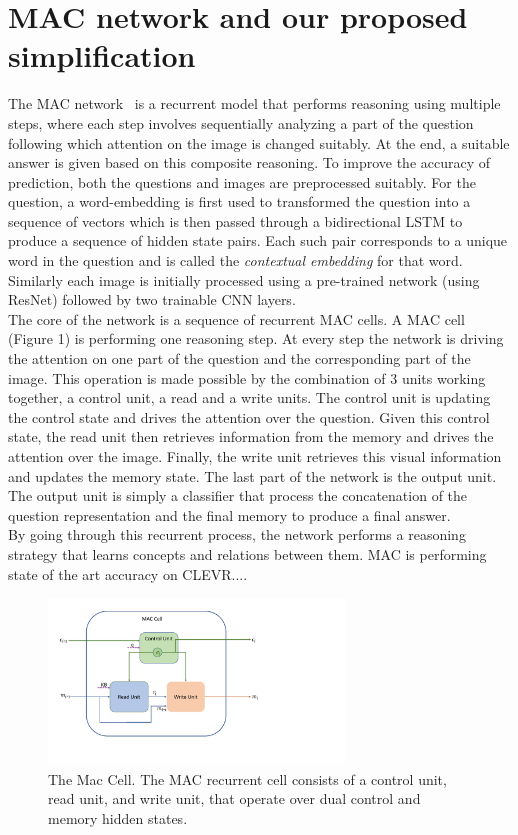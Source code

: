 \section{MAC network and our proposed simplification}

The MAC network~\cite{hudsonManning18} is a recurrent model that performs reasoning 
using multiple steps, where each step involves sequentially analyzing a part of the question following which attention on the image is changed suitably.
At the end, a suitable answer is given based on this composite reasoning.
To improve the accuracy of prediction, both the questions and images
are preprocessed suitably. For the question,  a word-embedding is first used to
transformed the question into a sequence of vectors which is then passed through
a bidirectional LSTM to produce a sequence of hidden state pairs. Each such pair 
corresponds to a unique word in the question and is called the 
\emph{contextual embedding} for that word.
Similarly each image is initially processed using a pre-trained network (using ResNet) followed by two trainable CNN layers.\\
The core of the network is a sequence of recurrent MAC cells. A MAC cell (Figure 1) is performing one reasoning step. At every step the network is driving the attention on one part of the question and the corresponding part of the image. This operation is made possible by the combination of 3 units working together, a control unit, a read and a write units. The control unit is updating the control state and drives the attention over the question. Given this control state, the read unit then retrieves information from the memory and drives the attention over the image.
Finally, the write unit retrieves this visual information and updates the memory state.
The last part of the network is the output unit. The output unit is simply a classifier that process the concatenation of the question representation and the final memory to produce a final answer.\\
By going through this recurrent process, the network performs a reasoning strategy that learns concepts and relations between them. 
MAC is performing state of the art accuracy on CLEVR....


\begin{figure}[htbp]
	\centering
	\includegraphics[width=0.7\textwidth]{img/mac_cell.pdf}
	\caption{The Mac Cell. The MAC recurrent cell consists of a control unit, read unit, and write unit, that operate over dual control and memory hidden states. }
	\label{fig:mac_cell}
\end{figure}






